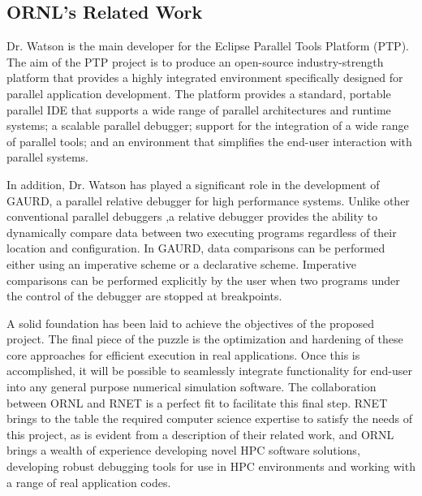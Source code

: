 \subsection{ORNL's Related Work}
\label{sec:nice}

Dr. Watson is the main developer for the Eclipse Parallel Tools Platform (PTP). The aim of the PTP project is to produce an open-source industry-strength platform that provides a highly integrated environment specifically designed for parallel application development. The platform provides a standard, portable parallel IDE that supports a wide range of parallel architectures and runtime systems; a scalable parallel debugger; support for the integration of a wide range of parallel tools; and an environment that simplifies the end-user interaction with parallel systems. 

In addition, Dr. Watson has played a significant role in the development of GAURD, a parallel relative debugger for high performance systems. Unlike other conventional parallel debuggers ,a relative debugger provides the
ability to dynamically compare data between two executing programs regardless of their location and configuration. In GAURD, data
comparisons can be performed either using an imperative scheme or a declarative scheme. Imperative comparisons can be performed
explicitly by the user when two programs under the control of the debugger are stopped at breakpoints. 

A solid foundation has been laid to achieve the objectives of the proposed project. The final 
 piece of the puzzle is the optimization and hardening of these core approaches for efficient execution in real applications. 
 Once this is accomplished, it will be possible to seamlessly integrate functionality for end-user \VV into any general purpose 
 numerical simulation software. The collaboration between ORNL and 
RNET is a perfect fit to facilitate this final step. RNET brings to the table the required computer science expertise to 
satisfy the needs of this project, as is evident from a description of their related work, and ORNL brings a wealth of experience developing novel HPC software solutions, developing robust debugging tools for use in HPC environments and working with a range of real application codes. 
